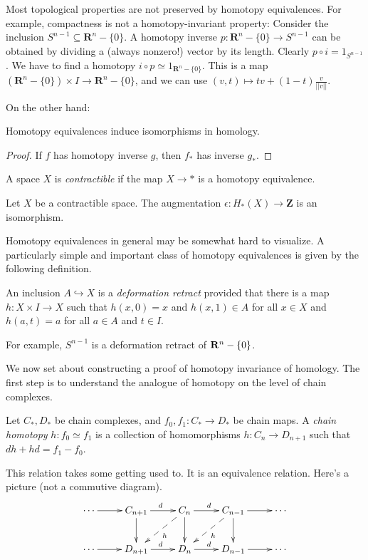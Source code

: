 Most topological properties are not preserved by homotopy equivalences.
For example, compactness is not a homotopy-invariant property: Consider the inclusion $S^{n-1}\subseteq \mathbf{R}^n-\{0\}$. A homotopy inverse $p:\mathbf{R}^n-\{0\}\to S^{n-1}$ can be obtained by dividing a (always nonzero!) vector by its length. Clearly $p\circ i=1_{S^{n-1}}$. We have to find a homotopy $i\circ p\simeq1_{\mathbf{R}^n-\{0\}}$. This is a map $(\mathbf{R}^n-\{0\})\times I\to \mathbf{R}^n-\{0\}$, and we can use $(v,t)\mapsto tv+(1-t)\frac{v}{||v||}$.

On the other hand:
\begin{corollary}
Homotopy equivalences induce isomorphisms in homology.
\end{corollary}
\begin{proof} 
If $f$ has homotopy inverse $g$, then $f_*$ has inverse $g_*$.
\end{proof}
\begin{definition}
A space $X$ is {\em contractible} if the map $X\to\ast$ is a homotopy equivalence.
\end{definition}
\begin{corollary}
Let $X$ be a contractible space. The augmentation $\epsilon:H_*(X)\to\mathbf{Z}$ is an isomorphism. 
\end{corollary}

Homotopy equivalences in general may be somewhat hard to visualize. 
A particularly simple and important class of homotopy equivalences is 
given by the following definition. 
\begin{definition}
An inclusion $A\hookrightarrow X$ is a {\em deformation retract} 
provided that there is a map $h:X\times I\to X$ such that 
$h(x,0)=x$ and $h(x,1)\in A$ for all $x\in X$ and $h(a,t)=a$ for all
$a\in A$ and $t\in I$. 
\end{definition}

For example, $S^{n-1}$ is a deformation retract of $\mathbf R^n-\{0\}$.

\bigskip
We now set about constructing a proof of homotopy invariance of homology. 
The first step is to understand the analogue of homotopy on the level of
chain complexes. 
	\begin{definition}
	Let $C_\ast,D_\ast$ be chain complexes, and $f_0,f_1:C_\ast\to D_\ast$ be chain maps. A {\em chain homotopy} $h:f_0\simeq f_1$ is a collection of homomorphisms $h:C_n\to D_{n+1}$ such that $dh+hd=f_1-f_0$.
	\end{definition}
This relation takes some getting used to. It is an equivalence relation.
Here's a picture (not a commutive diagram).
\begin{equation*}\xymatrix{
\cdots \ar[r] & 
C_{n+1}\ar[d]\ar[r]^d & C_n\ar@{-->}[dl]^h\ar[d]\ar[r]^d &
C_{n-1}\ar@{-->}[dl]^h\ar[d]\ar[r] & \cdots \\
\cdots \ar[r] & D_{n+1}\ar[r]^d & D_n \ar[r]^d & D_{n-1}\ar[r] & \cdots
}\end{equation*}

